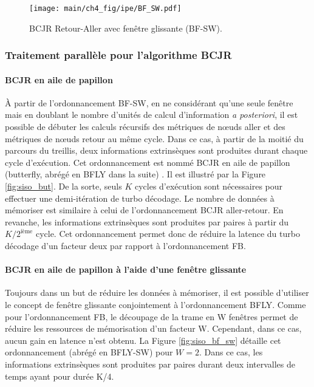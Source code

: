 \begin{figure}[!h]
	\centering
	\texttt{[image: main/ch4\_fig/ipe/BF\_SW.pdf]}
	\caption{BCJR Retour-Aller avec fenêtre glissante (BF-SW). \label{fig:siso_sw}}
\end{figure}

\subsubsection{Traitement parallèle pour l'algorithme BCJR}
\paragraph*{BCJR en aile de papillon}
À partir de l'ordonnancement BF-SW, en ne considérant qu'une seule fenêtre mais en doublant le nombre d'unités de 
calcul d'information \textit{a posteriori}, il est possible de débuter les calculs récursifs des métriques de nœuds 
aller et des métriques de nœuds retour au même cycle. Dans ce cas, à partir de la moitié du parcours du treillis, deux 
informations extrinsèques sont produites durant chaque cycle d'exécution. Cet ordonnancement est nommé BCJR en aile de papillon (butterfly, 
abrégé en BFLY dans la suite) \cite{butterfly}. Il est illustré par la Figure \ref{fig:siso_but}. De la sorte, seuls 
$K$ cycles d'exécution sont nécessaires pour effectuer une demi-itération de turbo décodage. Le nombre de données à mémoriser
est similaire à celui de l'ordonnancement BCJR aller-retour. En revanche, les informations extrinsèques sont produites par paires à 
partir du $K/2^{\text{ième}}$ cycle. Cet ordonnancement permet donc de réduire la latence du turbo décodage d'un 
facteur deux par rapport à l'ordonnancement FB.


\paragraph*{BCJR en aile de papillon à l'aide d'une fenêtre glissante}
Toujours dans un but de réduire les données à mémoriser, il est possible d'utiliser le concept de fenêtre 
glissante conjointement à l'ordonnancement BFLY. Comme pour l'ordonnancement FB, le découpage de la trame en W fenêtres 
permet de réduire les ressources de mémorisation d'un facteur W. Cependant, dans ce cas, aucun gain en latence n'est obtenu. La Figure \ref{fig:siso_bf_sw} détaille cet ordonnancement (abrégé en BFLY-SW) pour $W = 2$. Dans ce cas, 
les informations extrinsèques sont produites par paires durant deux intervalles de temps ayant pour durée K/4.


